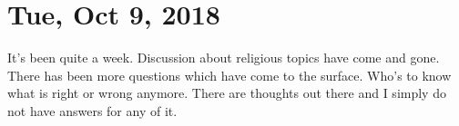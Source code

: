 \section{Tue, Oct 9, 2018}

It's been quite a week. Discussion about religious topics have come and gone.
There has been more questions which have come to the surface. Who's to know what
is right or wrong anymore. There are thoughts out there and I simply do not have
answers for any of it.
